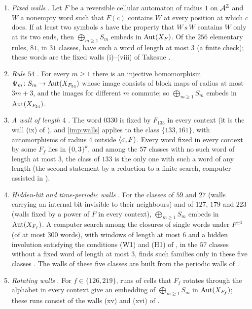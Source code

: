 \begin{enumerate}
\renewcommand{\theenumi}{I\arabic{enumi}}
\renewcommand{\labelenumi}{(\theenumi)}
\item\label{imp:walls} \emph{Fixed walls} \cite{PaperC}. Let $F$ be a reversible cellular automaton of radius $1$ on $\mathcal{A}^{\mathbb{Z}}$ and $W$ a nonempty word such that $F(c)$ contains $W$ at every position at which $c$ does. If at least two symbols $s$ have the property that $W\,s\,W$ contains $W$ only at its two ends, then $\bigoplus_{m\ge1}S_m$ embeds in $\operatorname{Aut}(X_F)$. Of the $256$ elementary rules, $81$, in $31$ classes, have such a word of length at most $3$ (a finite check); these words are the fixed walls (i)--(viii) of Takesue \cite[Fig.~2, Table~III]{Takesue1989}.
\item\label{imp:54} \emph{Rule $54$} \cite{PaperC}. For every $m\ge1$ there is an injective homomorphism $\Psi_m\colon S_m\to\operatorname{Aut}(X_{F_{54}})$ whose image consists of block maps of radius at most $3m+3$, and the images for different $m$ commute; so $\bigoplus_{m\ge1}S_m$ embeds in $\operatorname{Aut}(X_{F_{54}})$.
\item\label{imp:133} \emph{A wall of length $4$} \cite{PaperC}. The word $0330$ is fixed by $F_{133}$ in every context (it is the wall (ix) of \cite[Table~III and p.~391]{Takesue1989}), and \eqref{imp:walls} applies to the class $\{133,161\}$, with automorphisms of radius $4$ outside $\langle\sigma,F\rangle$. Every word fixed in every context by some $F_f$ lies in $\{0,3\}^k$, and among the $57$ classes with no such word of length at most $3$, the class of $133$ is the only one with such a word of any length (the second statement by a reduction to a finite search, computer-assisted in \cite{PaperC}).
\item\label{imp:hidden} \emph{Hidden-bit and time-periodic walls} \cite{PaperC}. For the classes of $59$ and $27$ (walls carrying an internal bit invisible to their neighbours) and of $127$, $179$ and $223$ (walls fixed by a power of $F$ in every context), $\bigoplus_{m\ge1}S_m$ embeds in $\operatorname{Aut}(X_{F_f})$. A computer search among the closures of single words under $F^{\pm1}$ (of at most $300$ words), with windows of length at most $6$ and a hidden involution satisfying the conditions (W1) and (H1) of \cite{PaperC}, in the $57$ classes without a fixed word of length at most $3$, finds such families only in these five classes \cite{PaperC}. The walls of these five classes are built from the periodic walls of \cite[Section~4]{Takesue1989}.
\item\label{imp:rot} \emph{Rotating walls} \cite{PaperC}. For $f\in\{126,219\}$, runs of cells that $F_f$ rotates through the alphabet in every context give an embedding of $\bigoplus_{m\ge1}S_m$ in $\operatorname{Aut}(X_{F_f})$; these runs consist of the walls (xv) and (xvi) of \cite[Fig.~2, Table~III]{Takesue1989}.

\end{enumerate}
